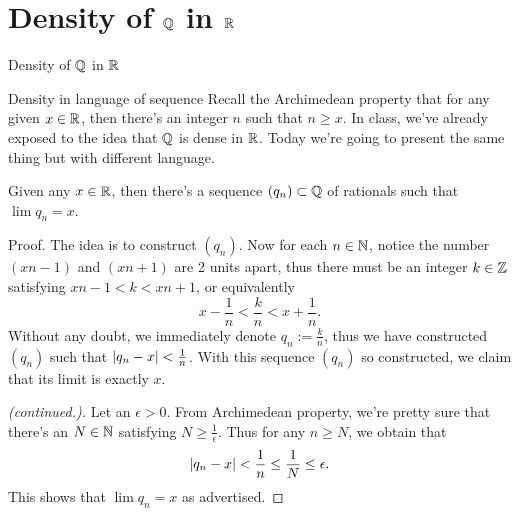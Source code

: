 \documentclass{beamer}
\begin{document}
\section{Density of $\Q$ in $\R$}
\begin{frame}[plain]
  \begin{center}
    {\huge\color{blue} Density of $\Q$ in $\R$}
  \end{center}
\end{frame}
\begin{frame}{Density in language of sequence}
  Recall the Archimedean property that for any given $x\in\R$, 
  then there's an integer $n$ such that $n\geq x$.
  \pause
  In class, we've already exposed to the idea that $\Q$ is dense
  in $\R$. Today we're going to present the same thing but with
  different language.
  \pause
  \begin{theorem}
    Given any $x\in\R$, then there's a sequence $(q_n)\subset\Q$
    of rationals such that $\lim q_n=x$.
  \end{theorem}
\end{frame}
\begin{frame}
  \begin{block}{Proof.}
    The idea is to construct $(q_n)$. \pause
    Now for each $n\in\N$, notice the number $(xn-1)$ and $(xn+1)$ are 2 units apart,
    \pause
    thus there must be an integer $k\in\Z$ satisfying
    $xn-1<k<xn+1$, or equivalently
    \[x-\frac{1}{n}<\frac{k}{n}<x+\frac{1}{n}.\]
    \pause
    Without any doubt, we immediately denote $q_n:=\frac{k}{n}$, 
    thus we have constructed $(q_n)$ such that $\lvert q_n-x\rvert<\frac{1}{n}$. 
    \pause
    With this sequence $(q_n)$ so constructed, we claim that its limit
    is exactly $x$.
  \end{block}
\end{frame}
\begin{frame}
  \begin{proof}[(continued.)]
    Let an $\epsilon>0$.\pause 
    From Archimedean property, we're pretty sure
    that there's an $N\in\N$ satisfying $N\geq\frac{1}{\epsilon}$.
    \pause
    Thus for any $n\geq N$, we obtain that
    \[ \lvert q_n-x\rvert<\frac{1}{n}\leq\frac{1}{N}\leq\epsilon. \]
    This shows that $\lim q_n=x$ as advertised.
  \end{proof}
\end{frame}
\end{document}
